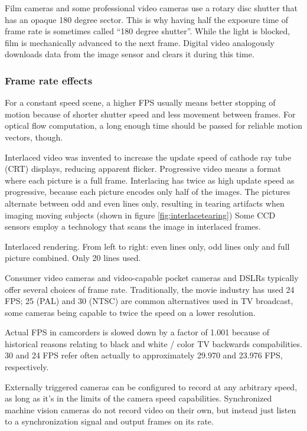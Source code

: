 Film cameras and some professional video cameras use a rotary disc shutter that has an opaque 180 degree sector.
This is why having half the exposure time of frame rate is sometimes called ``180 degree shutter''.
While the light is blocked, film is mechanically advanced to the next frame.
Digital video analogously downloads data from the image sensor and clears it during this time.


\subsubsection{Frame rate effects} %

For a constant speed scene, a higher FPS usually means better stopping of motion because of shorter shutter speed and less movement between frames.
For optical flow computation, a long enough time should be passed for reliable motion vectors, though.

Interlaced video was invented to increase the update speed of cathode ray tube (CRT) displays, reducing apparent flicker.
Progressive video means a format where each picture is a full frame.
Interlacing has twice as high update speed as progressive, because each picture encodes only half of the images.
The pictures alternate between odd and even lines only, resulting in tearing artifacts when imaging moving subjects (shown in figure \ref{fig:interlacetearing})
Some CCD sensors employ a technology that scans the image in interlaced frames.

{Interlaced rendering. From left to right: even lines only, odd lines only and full picture combined. Only 20 lines used.}

Consumer video cameras and video-capable pocket cameras and DSLRs typically offer several choices of frame rate. Traditionally, the movie industry has used 24 FPS; 25 (PAL) and 30 (NTSC) are common alternatives used in TV broadcast, some cameras being capable to twice the speed on a lower resolution.

Actual FPS in camcorders is slowed down by a factor of 1.001 because of historical reasons relating to black and white / color TV backwards compabilities.
30 and 24 FPS refer often actually to approximately 29.970 and 23.976 FPS, respectively.

Externally triggered cameras can be configured to record at any arbitrary speed, as long as it's in the limits of the camera speed capabilities.
Synchronized machine vision cameras do not record video on their own, but instead just listen to a synchronization signal and output frames on its rate.

